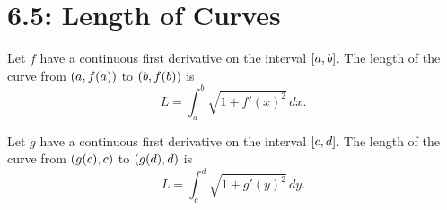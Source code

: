 \documentclass[../mathNotesPreamble]{subfiles}
\begin{document}
  \section*{6.5: Length of Curves}

  \begin{defn*}[Arc Length for $y=f(x)$]
    Let $f$ have a continuous first derivative on the interval ${\left[a,b\right]}$. The length of the curve from ${\left(a, f(a)\right)}$ to ${\left(b, f(b)\right)}$ is
      \[L=\int_a^b \sqrt{1+f'(x)^2}\,dx.\]
  \end{defn*}

  \begin{defn*}[Arc Length for $x=g(y)$]
    Let $g$ have a continuous first derivative on the interval ${\left[c,d\right]}$. The length of the curve from ${\left(g(c),c\right)}$ to ${\left(g(d),d\right)}$ is
      \[L=\int_c^d \sqrt{1+g'(y)^2}\,dy.\]
  \end{defn*}

  
\end{document}
